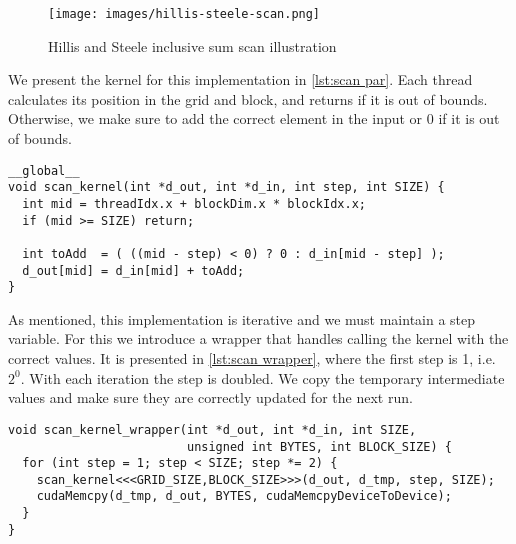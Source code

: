 \begin{figure}[htb]
  \centering
  \texttt{[image: images/hillis-steele-scan.png]}
  \caption{Hillis and Steele inclusive sum scan illustration}
  \label{fig:hillis steele scan}
\end{figure}

We present the kernel for this implementation in \cref{lst:scan par}.
Each thread calculates its position in the grid and block, and returns if it is out of bounds.
Otherwise, we make sure to add the correct element in the input or 0 if it is out of bounds.

\begin{lstlisting}[caption={Hillis and Steele scan kernel}, label={lst:scan par}]
__global__
void scan_kernel(int *d_out, int *d_in, int step, int SIZE) {
  int mid = threadIdx.x + blockDim.x * blockIdx.x;
  if (mid >= SIZE) return;

  int toAdd  = ( ((mid - step) < 0) ? 0 : d_in[mid - step] );
  d_out[mid] = d_in[mid] + toAdd;
}
\end{lstlisting}

As mentioned, this implementation is iterative and we must maintain a step variable.
For this we introduce a wrapper that handles calling the kernel with the correct values.
It is presented in \cref{lst:scan wrapper}, where the first step is 1, i.e. $2^0$.
With each iteration the step is doubled.
We copy the temporary intermediate values and make sure they are correctly updated for the next run.

\begin{lstlisting}[caption={Hillis and Steele scan kernel wrapper}, label={lst:scan wrapper}]
void scan_kernel_wrapper(int *d_out, int *d_in, int SIZE, 
                         unsigned int BYTES, int BLOCK_SIZE) {
  for (int step = 1; step < SIZE; step *= 2) {
    scan_kernel<<<GRID_SIZE,BLOCK_SIZE>>>(d_out, d_tmp, step, SIZE);
    cudaMemcpy(d_tmp, d_out, BYTES, cudaMemcpyDeviceToDevice);
  }
}
\end{lstlisting}

